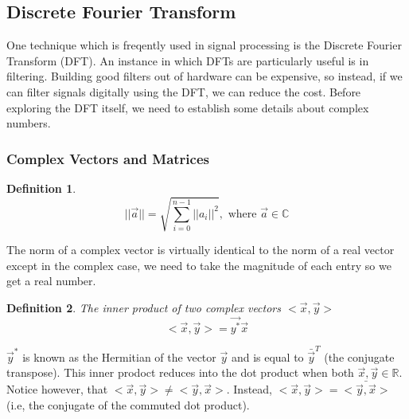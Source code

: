 \documentclass{article}
\newtheorem{definition}{Definition}
\begin{document}
\subsection{Discrete Fourier Transform}
One technique which is freqently used in signal processing is the Discrete Fourier Transform (DFT).
An instance in which DFTs are particularly useful is in filtering. Building good filters out of hardware
can be expensive, so instead, if we can filter signals digitally using the DFT, we can reduce the cost.
Before exploring the DFT itself, we need to establish some details about complex numbers.
\subsubsection{Complex Vectors and Matrices}
\begin{definition}
    $$||\vec{a}|| = \sqrt{\sum_{i=0}^{n-1}{||a_i||^2}},\text{ where } \vec{a}\in\mathbb{C}$$
\end{definition}
The norm of a complex vector is virtually identical to the norm of a real vector except in the complex case, we need to take the magnitude of each entry so we get a real number.
\begin{definition}
    The inner product of two complex vectors $<\vec{x}, \vec{y}>$
    $$<\vec{x},\vec{y}> = \vec{y^*}\vec{x}$$
\end{definition}
$\vec{y}^*$ is known as the Hermitian of the vector $\vec{y}$ and is equal to $\bar{\vec{y}}^T$ (the conjugate transpose).
This inner prodoct reduces into the dot product when both $\vec{x}, \vec{y}\in \mathbb{R}$. Notice however, that $<\vec{x},\vec{y}>\ne <\vec{y},\vec{x}>$.
Instead, $<\vec{x},\vec{y}>=\bar{<\vec{y},\vec{x}>}$ (i.e, the conjugate of the commuted dot product).
\end{document}
